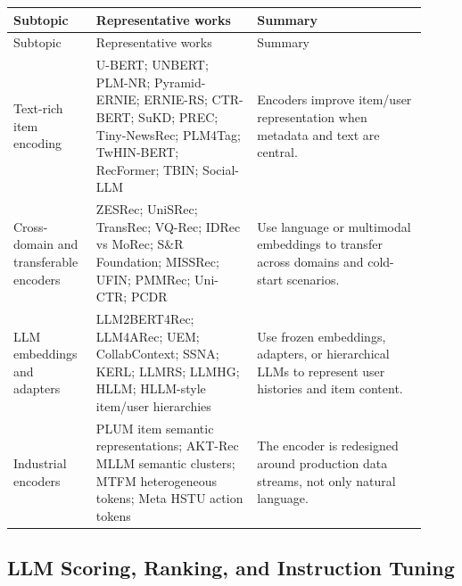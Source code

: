 \documentclass[11pt]{article}
\begin{document}
\small
\begin{longtable}{@{}p{0.18\linewidth}p{0.36\linewidth}p{0.38\linewidth}@{}}
\toprule
Subtopic & Representative works & Summary\\
\midrule
\endfirsthead
\toprule
Subtopic & Representative works & Summary\\
\midrule
\endhead
Text-rich item encoding & U-BERT; UNBERT; PLM-NR; Pyramid-ERNIE; ERNIE-RS; CTR-BERT; SuKD; PREC; Tiny-NewsRec; PLM4Tag; TwHIN-BERT; RecFormer; TBIN; Social-LLM & Encoders improve item/user representation when metadata and text are central.\\
Cross-domain and transferable encoders & ZESRec; UniSRec; TransRec; VQ-Rec; IDRec vs MoRec; S\&R Foundation; MISSRec; UFIN; PMMRec; Uni-CTR; PCDR & Use language or multimodal embeddings to transfer across domains and cold-start scenarios.\\
LLM embeddings and adapters & LLM2BERT4Rec; LLM4ARec; UEM; CollabContext; SSNA; KERL; LLMRS; LLMHG; HLLM; HLLM-style item/user hierarchies & Use frozen embeddings, adapters, or hierarchical LLMs to represent user histories and item content.\\
Industrial encoders & PLUM item semantic representations; AKT-Rec MLLM semantic clusters; MTFM heterogeneous tokens; Meta HSTU action tokens & The encoder is redesigned around production data streams, not only natural language.\\
\bottomrule
\end{longtable}
\normalsize

\subsection{LLM Scoring, Ranking, and Instruction Tuning}
\end{document}
